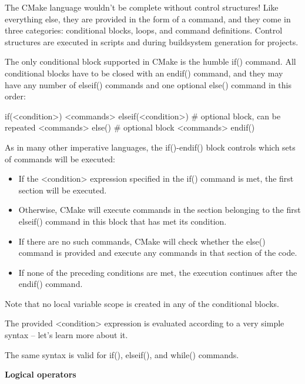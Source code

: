 The CMake language wouldn’t be complete without control structures! Like everything else, they are provided in the form of a command, and they come in three categories: conditional blocks, loops, and command definitions. Control structures are executed in scripts and during buildsystem generation for projects.


The only conditional block supported in CMake is the humble if() command. All conditional blocks have to be closed with an endif() command, and they may have any number of elseif() commands and one optional else() command in this order:

\begin{shell}
if(<condition>)
    <commands>
elseif(<condition>) # optional block, can be repeated
    <commands>
else() # optional block
    <commands>
endif()
\end{shell}

As in many other imperative languages, the if()-endif() block controls which sets of commands will be executed:

\begin{itemize}
\item
If the <condition> expression specified in the if() command is met, the first section will be executed.

\item
Otherwise, CMake will execute commands in the section belonging to the first elseif() command in this block that has met its condition.

\item
If there are no such commands, CMake will check whether the else() command is provided and execute any commands in that section of the code.

\item
If none of the preceding conditions are met, the execution continues after the endif() command.
\end{itemize}

Note that no local variable scope is created in any of the conditional blocks.

The provided <condition> expression is evaluated according to a very simple syntax – let’s learn more about it.


The same syntax is valid for if(), elseif(), and while() commands.

\noindent
\textbf{Logical operators}


